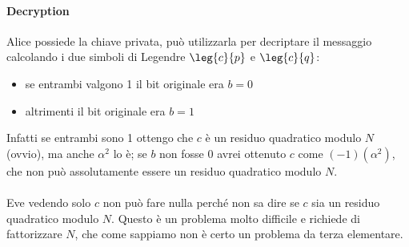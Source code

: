 	\paragraph{Decryption} Alice possiede la chiave privata, può utilizzarla per decriptare il messaggio calcolando i due simboli di Legendre $\leg{c}{p}$ e $\leg{c}{q}$:
	\begin{itemize}
		\item se entrambi valgono 1 il bit originale era $b=0$
		\item altrimenti il bit originale era $b=1$
	\end{itemize}
	Infatti se entrambi sono 1 ottengo che $c$ è un residuo quadratico modulo $N$ (ovvio), ma anche $\alpha^2$ lo è; se $b$ non fosse 0 avrei ottenuto $c$ come $(-1)(\alpha^2)$, che non può assolutamente essere un residuo quadratico modulo $N$. \\ \\
	Eve vedendo solo $c$ non può fare nulla perché non sa dire se $c$ sia un residuo quadratico modulo $N$. Questo è un problema molto difficile e richiede di fattorizzare $N$, che come sappiamo non è certo un problema da terza elementare.
